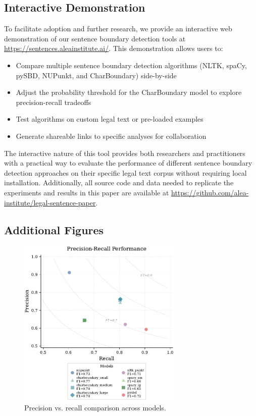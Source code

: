 \subsection{Interactive Demonstration}
\label{appendix:demo}

To facilitate adoption and further research, we provide an interactive web demonstration of our sentence boundary detection tools at \url{https://sentences.aleainstitute.ai/}. This demonstration allows users to:

\begin{itemize}
\item Compare multiple sentence boundary detection algorithms (NLTK, spaCy, pySBD, NUPunkt, and CharBoundary) side-by-side
\item Adjust the probability threshold for the CharBoundary model to explore precision-recall tradeoffs
\item Test algorithms on custom legal text or pre-loaded examples
\item Generate shareable links to specific analyses for collaboration
\end{itemize}

The interactive nature of this tool provides both researchers and practitioners with a practical way to evaluate the performance of different sentence boundary detection approaches on their specific legal text corpus without requiring local installation. Additionally, all source code and data needed to replicate the experiments and results in this paper are available at \url{https://github.com/alea-institute/legal-sentence-paper}.

\subsection{Additional Figures}
\label{appendix:Figures}

\begin{figure}[htbp]
\centering
\includegraphics[width=0.7\textwidth]{figures/precision_recall.pdf}
\caption{Precision vs. recall comparison across models.}
\label{fig:precision_recall_tradeoff}
\end{figure}

